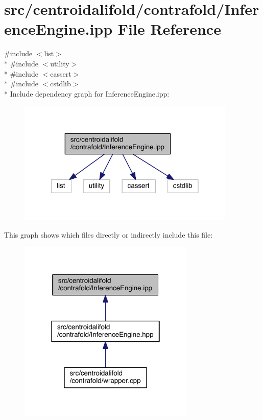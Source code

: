 \hypertarget{centroidalifold_2contrafold_2_inference_engine_8ipp}{\section{src/centroidalifold/contrafold/\+Inference\+Engine.ipp File Reference}
\label{centroidalifold_2contrafold_2_inference_engine_8ipp}
}
{\ttfamily \#include $<$list$>$}\\*
{\ttfamily \#include $<$utility$>$}\\*
{\ttfamily \#include $<$cassert$>$}\\*
{\ttfamily \#include $<$cstdlib$>$}\\*
Include dependency graph for Inference\+Engine.\+ipp\+:
\nopagebreak
\begin{figure}[H]
\begin{center}
\leavevmode
\includegraphics[width=295pt]{centroidalifold_2contrafold_2_inference_engine_8ipp__incl}
\end{center}
\end{figure}
This graph shows which files directly or indirectly include this file\+:
\nopagebreak
\begin{figure}[H]
\begin{center}
\leavevmode
\includegraphics[width=238pt]{centroidalifold_2contrafold_2_inference_engine_8ipp__dep__incl}
\end{center}
\end{figure}
